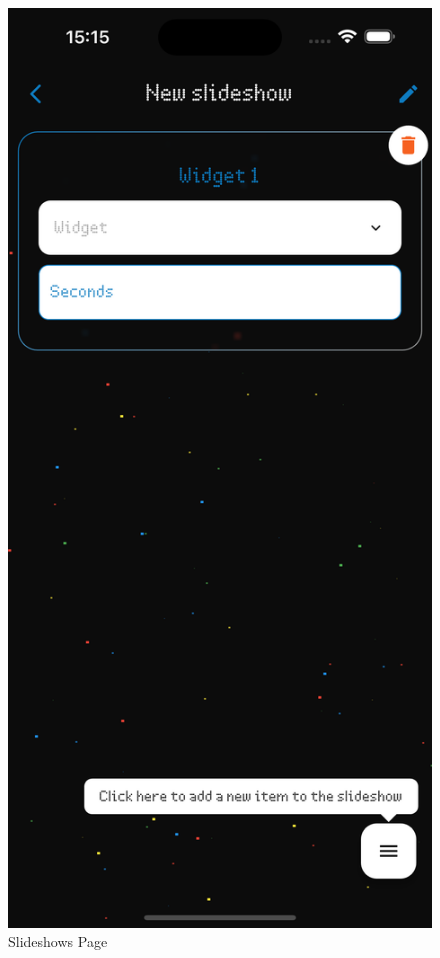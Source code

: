 \begin{figure}[h]
\begin{minipage}[b]{0.32\textwidth}
        \caption*{Slideshows Page}
    \end{minipage}
    \begin{minipage}[b]{0.32\textwidth}
        \centering
        \includegraphics[width=\textwidth]{tesi/img/client_demo/slideshows/new.png}

\end{minipage}
\end{figure}

